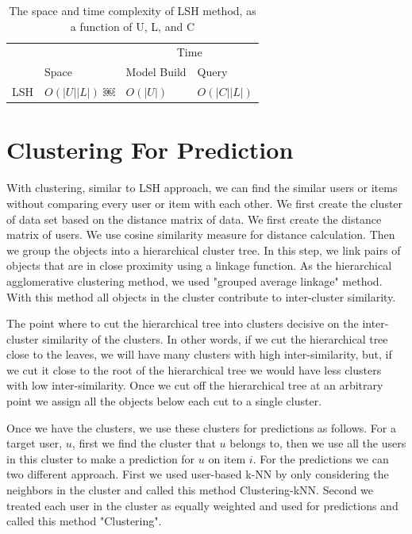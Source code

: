 \documentclass[conference]{IEEEtran}
\begin{document}
\begin{table}
\centering
\begin{tabular}{llll}
\hline
& & \multicolumn {2}{c}{Time} \\
\cline{3-4}
     & Space & Model Build  & Query \\
\hline
LSH & $O(|U||L|)$ ￼& $O(|U|)$ &$O(|C||L|)$ \\
\hline
\end{tabular}
\caption{The space and time complexity of LSH  method, as a function of U, L, and C}
\label{table:complexity-lsh}
\end{table}

\section{Clustering For Prediction}
\label{sec:cluster-prediction}

With clustering, similar to LSH approach, we can find the similar users or items 
without comparing every user or item with each other. We first create the cluster of data set based on the distance matrix of data. We first create the distance matrix of users. We use cosine similarity measure for distance calculation. Then we group the objects into a hierarchical cluster tree. In this step, we link pairs of objects that are in close proximity using a linkage function. As the hierarchical agglomerative clustering method, we used "grouped average linkage" method. With this method all objects in the cluster contribute to inter-cluster similarity. 

The point where to cut the hierarchical tree into clusters decisive on the inter-cluster similarity of the clusters. In other words, if we cut the hierarchical tree close to the leaves, we will have many clusters with high inter-similarity, but, if we cut it close to the root of the hierarchical tree we would have less clusters with low inter-similarity. Once we cut off the hierarchical tree at an arbitrary
point we assign all the objects below each cut to a single cluster. 

Once we have the clusters, we use these clusters for predictions as follows. For a target user, $u$, first we find the cluster that $u$ belongs to, then we use all the users in this cluster to make a prediction for $u$ on item $i$. For the predictions we can two different approach. First we used user-based k-NN by only considering the neighbors in the cluster and called this method Clustering-kNN. Second we treated each user in the cluster as equally weighted and used for predictions and called this method "Clustering".
\end{document}

